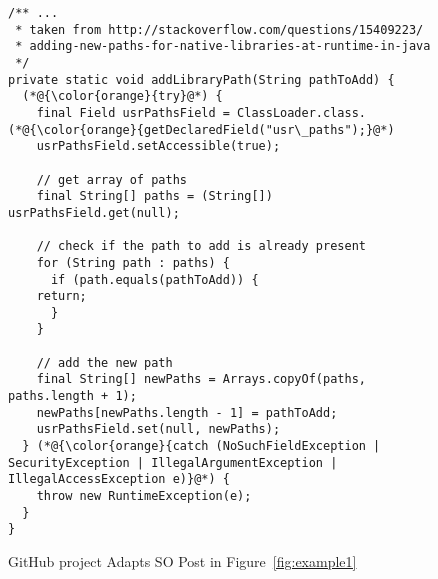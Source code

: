\begin{figure}[t]%
	\centering
\begin{lstlisting}[]
/** ...
 * taken from http://stackoverflow.com/questions/15409223/
 * adding-new-paths-for-native-libraries-at-runtime-in-java
 */
private static void addLibraryPath(String pathToAdd) {
  (*@{\color{orange}{try}@*) {
    final Field usrPathsField = ClassLoader.class.(*@{\color{orange}{getDeclaredField("usr\_paths");}@*)
    usrPathsField.setAccessible(true);

    // get array of paths
    final String[] paths = (String[]) usrPathsField.get(null);

    // check if the path to add is already present
    for (String path : paths) {
      if (path.equals(pathToAdd)) {
	return;
      }
    }

    // add the new path
    final String[] newPaths = Arrays.copyOf(paths, paths.length + 1);
    newPaths[newPaths.length - 1] = pathToAdd;
    usrPathsField.set(null, newPaths);
  } (*@{\color{orange}{catch (NoSuchFieldException | SecurityException | IllegalArgumentException |    IllegalAccessException e)}@*) {
	throw new RuntimeException(e);
  }
}
\end{lstlisting}
        \vspace{-12pt}
        \caption{GitHub project  Adapts SO Post in Figure~\ref{fig:example1}}
        \label{fig:example2}
\end{figure}
